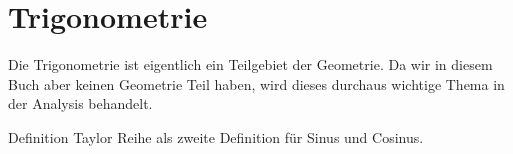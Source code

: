
\chapter{Trigonometrie}

Die Trigonometrie ist eigentlich ein Teilgebiet der Geometrie. Da wir in diesem Buch aber keinen Geometrie Teil haben, wird dieses durchaus wichtige Thema in der Analysis behandelt. 

\begin{TODO}
Definition Taylor Reihe als zweite Definition für Sinus und Cosinus.
\end{TODO}